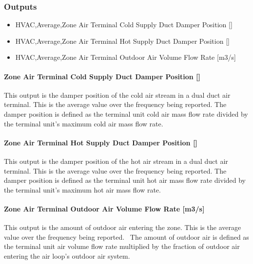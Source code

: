 \subsubsection{Outputs}\label{outputs-13}

\begin{itemize}
\item
  HVAC,Average,Zone Air Terminal Cold Supply Duct Damper Position {[]}
\item
  HVAC,Average,Zone Air Terminal Hot Supply Duct Damper Position {[]}
\item
  HVAC,Average,Zone Air Terminal Outdoor Air Volume Flow Rate {[}m3/s{]}
\end{itemize}

\paragraph{Zone Air Terminal Cold Supply Duct Damper Position {[]}}\label{zone-air-terminal-cold-supply-duct-damper-position-1}

This output is the damper position of the cold air stream in a dual duct air terminal. This is the average value over the frequency being reported. The damper position is defined as the terminal unit cold air mass flow rate divided by the terminal unit's maximum cold air mass flow rate.

\paragraph{Zone Air Terminal Hot Supply Duct Damper Position {[]}}\label{zone-air-terminal-hot-supply-duct-damper-position-1}

This output is the damper position of the hot air stream in a dual duct air terminal. This is the average value over the frequency being reported. The damper position is defined as the terminal unit hot air mass flow rate divided by the terminal unit's maximum hot air mass flow rate.

\paragraph{Zone Air Terminal Outdoor Air Volume Flow Rate {[}m3/s{]}}\label{zone-air-terminal-outdoor-air-volume-flow-rate-m3s-2}

This output is the amount of outdoor air entering the zone. This is the average value over the frequency being reported.~ The amount of outdoor air is defined as the terminal unit air volume flow rate multiplied by the fraction of outdoor air entering the air loop's outdoor air system.

